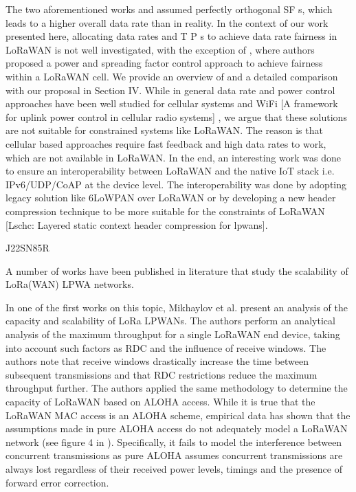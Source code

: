 The two aforementioned works \cite{bor_lora_2017} and \cite{cuomo_explora_2017} assumed perfectly orthogonal SF s,
	which leads to a higher overall data rate than in reality.
In the context of our work presented here,
	allocating data rates and T P s to achieve data rate fairness in LoRaWAN is not well investigated,
	with the exception of \cite{reynders_power_2017},
	where authors proposed a power and spreading factor control approach to achieve fairness within a LoRaWAN cell.
We provide an overview of \cite{reynders_power_2017} and a detailed comparison with our proposal in Section IV.
While in general data rate and power control approaches have been well studied for cellular systems and WiFi [A framework for uplink power control in cellular radio systems] \cite{subramanian_joint_2005},
	we argue that these solutions are not suitable for constrained systems like LoRaWAN.
The reason is that cellular based approaches require fast feedback and high data rates to work,
	which are not available in LoRaWAN.
In the end,
	an interesting work was done to ensure an interoperability between LoRaWAN and the native IoT stack i.e.
IPv6/UDP/CoAP at the device level.
The interoperability was done by adopting legacy solution like 6LoWPAN over LoRaWAN \cite{weber_ipv6_2016} or by developing a new header compression technique to be more suitable for the constraints of LoRaWAN [Lschc:
	Layered static context header compression for lpwans].

\cite{abeele_scalability_2017} J22SN85R

A number of works have been published in literature that study the scalability of LoRa(WAN) LPWA networks.

In one of the first works on this topic,
	Mikhaylov et al.
\cite{mikhaylov_analysis_2016} present an analysis of the capacity and scalability of LoRa LPWANs.
The authors perform an analytical analysis of the maximum throughput for a single LoRaWAN end device,
	taking into account such factors as RDC and the influence of receive windows.
The authors note that receive windows drastically increase the time between subsequent transmissions and that RDC restrictions reduce the maximum throughput further.
The authors applied the same methodology to determine the capacity of LoRaWAN based on ALOHA access.
While it is true that the LoRaWAN MAC access is an ALOHA scheme,
	empirical data has shown that the assumptions made in pure ALOHA access do not adequately model a LoRaWAN network (see figure 4 in \cite{bor_lora_2016}).
Specifically,
	it fails to model the interference between concurrent transmissions as pure ALOHA assumes concurrent transmissions are always lost regardless of their received power levels,
	timings and the presence of forward error correction.

